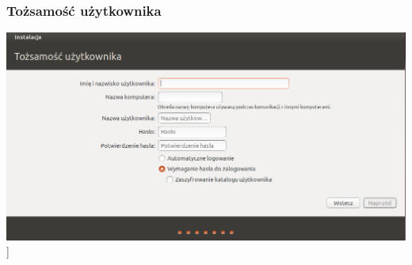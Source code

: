 \subsubsection{Tożsamość użytkownika}
\begin{center}
        \includegraphics[width=\linewidth]{images/instalator_dane.png}]
\end{center}

